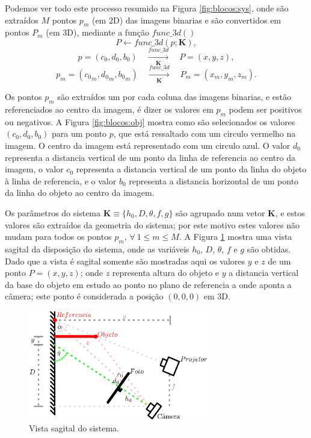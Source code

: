 \documentclass[a4paper, 12pt]{article}
\begin{document}
Podemos ver todo este processo resumido na Figura \ref{fig:blocos:sys},
onde são extraídos $M$ pontos $p_m$ (em 2D) das imagens binarias 
e são convertidos em pontos $P_m$ (em 3D),
mediante a função $func\_3d()$ 
\begin{equation}
P \leftarrow func\_3d(p;\mathbf{K}),
\end{equation}
\begin{equation}
p=(c_0,d_0,b_0)\quad \xrightarrow[\mathbf{K}]{func\_3d} \quad P=(x,y,z),
\end{equation}
\begin{equation}
p_m=({c_0}_m,{d_0}_m,{b_0}_m)\quad \xrightarrow[\mathbf{K}]{func\_3d}\quad P_m=(x_m,y_m,z_m).
\end{equation}

Os pontos $p_m$ são extraídos um por cada coluna das imagens binarias,
e estão referenciados ao centro da imagem, é dizer os valores em $p_m$ podem ser positivos ou negativos.
A Figura \ref{fig:blocos:obj} mostra como são selecionados os valores $(c_0,d_0,b_0)$ para um ponto $p$,
que está ressaltado com um circulo vermelho na imagem. 
O centro da imagem está representado com um circulo azul.
O valor $d_0$ representa a distancia vertical de um ponto da linha de referencia ao centro da imagem,
o valor $c_0$ representa a distancia vertical de um ponto da linha do objeto à linha de referencia, e
o valor $b_0$   representa a distancia horizontal de um ponto da linha do objeto ao centro da imagem.

Os parâmetros do sistema $\mathbf{K}\equiv \{h_0,D,\theta,f,g\}$ são agrupado num vetor $\mathbf{K}$,
e estos valores são extraídos da geometria do sistema; 
por este motivo estes valores não mudam para todos os pontos $p_m$, $\forall~ 1\leq m \leq M$.
A Figura \ref{fig:setup1} mostra uma vista sagital da disposição do sistema,
onde as variáveis $h_0$, $D$, $\theta$, $f$ e $g$ são obtidas. 
Dado que a vista é sagital somente são mostradas aqui os valores $y$ e $z$
de um ponto $P=(x,y,z)$;
onde $z$ representa  altura do objeto e 
$y$ a distancia vertical da base do objeto em estudo ao ponto no plano de referencia a onde aponta a câmera;
este ponto é considerada a posição $(0,0,0)$ em 3D.
\begin{figure}[!h]
     \centering
         \includegraphics[width=0.7\textwidth]{Diagrama1.eps}
\caption{Vista sagital do sistema.}
\label{fig:setup1}
\end{figure}
\end{document}

